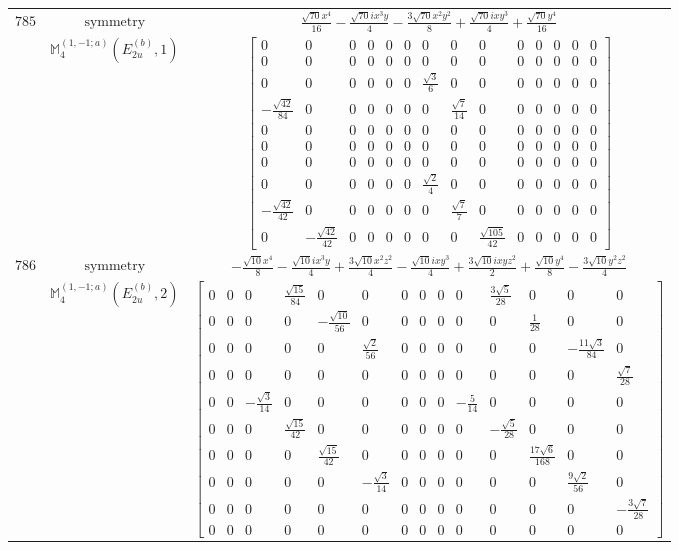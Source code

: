 \documentclass[fleqn,8pt,landscape]{jsarticle}
\begin{document}
\begin{longtable}{ccc}
$ 785 $ & $ \text{symmetry} $ & $ \frac{\sqrt{70} x^{4}}{16} - \frac{\sqrt{70} i x^{3} y}{4} - \frac{3 \sqrt{70} x^{2} y^{2}}{8} + \frac{\sqrt{70} i x y^{3}}{4} + \frac{\sqrt{70} y^{4}}{16} $ \\
$  $ & $ \mathbb{M}_{4}^{(1,-1;a)}(E_{2u}^{(b)},1) $ & $ \begin{bmatrix} 0 & 0 & 0 & 0 & 0 & 0 & 0 & 0 & 0 & 0 & 0 & 0 & 0 & 0 \\ 0 & 0 & 0 & 0 & 0 & 0 & 0 & 0 & 0 & 0 & 0 & 0 & 0 & 0 \\ 0 & 0 & 0 & 0 & 0 & 0 & \frac{\sqrt{3}}{6} & 0 & 0 & 0 & 0 & 0 & 0 & 0 \\ - \frac{\sqrt{42}}{84} & 0 & 0 & 0 & 0 & 0 & 0 & \frac{\sqrt{7}}{14} & 0 & 0 & 0 & 0 & 0 & 0 \\ 0 & 0 & 0 & 0 & 0 & 0 & 0 & 0 & 0 & 0 & 0 & 0 & 0 & 0 \\ 0 & 0 & 0 & 0 & 0 & 0 & 0 & 0 & 0 & 0 & 0 & 0 & 0 & 0 \\ 0 & 0 & 0 & 0 & 0 & 0 & 0 & 0 & 0 & 0 & 0 & 0 & 0 & 0 \\ 0 & 0 & 0 & 0 & 0 & 0 & \frac{\sqrt{2}}{4} & 0 & 0 & 0 & 0 & 0 & 0 & 0 \\ - \frac{\sqrt{42}}{42} & 0 & 0 & 0 & 0 & 0 & 0 & \frac{\sqrt{7}}{7} & 0 & 0 & 0 & 0 & 0 & 0 \\ 0 & - \frac{\sqrt{42}}{42} & 0 & 0 & 0 & 0 & 0 & 0 & \frac{\sqrt{105}}{42} & 0 & 0 & 0 & 0 & 0 \end{bmatrix} $ \\ \hline
$ 786 $ & $ \text{symmetry} $ & $ - \frac{\sqrt{10} x^{4}}{8} - \frac{\sqrt{10} i x^{3} y}{4} + \frac{3 \sqrt{10} x^{2} z^{2}}{4} - \frac{\sqrt{10} i x y^{3}}{4} + \frac{3 \sqrt{10} i x y z^{2}}{2} + \frac{\sqrt{10} y^{4}}{8} - \frac{3 \sqrt{10} y^{2} z^{2}}{4} $ \\
$  $ & $ \mathbb{M}_{4}^{(1,-1;a)}(E_{2u}^{(b)},2) $ & $ \begin{bmatrix} 0 & 0 & 0 & \frac{\sqrt{15}}{84} & 0 & 0 & 0 & 0 & 0 & 0 & \frac{3 \sqrt{5}}{28} & 0 & 0 & 0 \\ 0 & 0 & 0 & 0 & - \frac{\sqrt{10}}{56} & 0 & 0 & 0 & 0 & 0 & 0 & \frac{1}{28} & 0 & 0 \\ 0 & 0 & 0 & 0 & 0 & \frac{\sqrt{2}}{56} & 0 & 0 & 0 & 0 & 0 & 0 & - \frac{11 \sqrt{3}}{84} & 0 \\ 0 & 0 & 0 & 0 & 0 & 0 & 0 & 0 & 0 & 0 & 0 & 0 & 0 & \frac{\sqrt{7}}{28} \\ 0 & 0 & - \frac{\sqrt{3}}{14} & 0 & 0 & 0 & 0 & 0 & 0 & - \frac{5}{14} & 0 & 0 & 0 & 0 \\ 0 & 0 & 0 & \frac{\sqrt{15}}{42} & 0 & 0 & 0 & 0 & 0 & 0 & - \frac{\sqrt{5}}{28} & 0 & 0 & 0 \\ 0 & 0 & 0 & 0 & \frac{\sqrt{15}}{42} & 0 & 0 & 0 & 0 & 0 & 0 & \frac{17 \sqrt{6}}{168} & 0 & 0 \\ 0 & 0 & 0 & 0 & 0 & - \frac{\sqrt{3}}{14} & 0 & 0 & 0 & 0 & 0 & 0 & \frac{9 \sqrt{2}}{56} & 0 \\ 0 & 0 & 0 & 0 & 0 & 0 & 0 & 0 & 0 & 0 & 0 & 0 & 0 & - \frac{3 \sqrt{7}}{28} \\ 0 & 0 & 0 & 0 & 0 & 0 & 0 & 0 & 0 & 0 & 0 & 0 & 0 & 0 \end{bmatrix} $ \\ \hline

\end{longtable}
\end{document}
